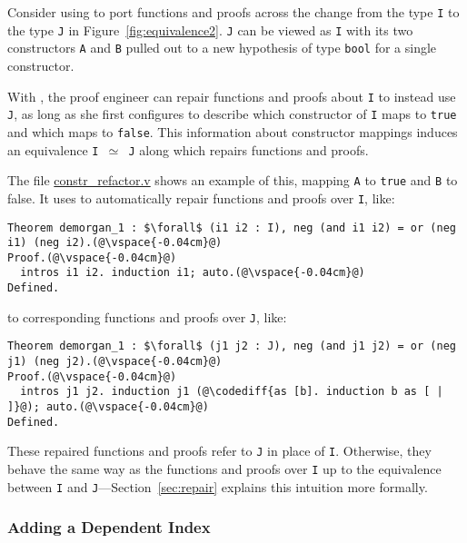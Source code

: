 Consider using \toolname to port functions and proofs across the change from the type \lstinline{I} to the type \lstinline{J} 
in Figure~\ref{fig:equivalence2}.
\lstinline{J} can be viewed as \lstinline{I} with its two constructors \lstinline{A} and \lstinline{B} pulled out to a
new hypothesis of type \lstinline{bool} for a single constructor.

With \toolname, the proof engineer can repair functions and proofs about \lstinline{I} to instead use \lstinline{J},
as long as she first configures \toolname to describe which constructor 
of \lstinline{I} maps to \lstinline{true} and which maps to \lstinline{false}.
This information about constructor mappings induces an equivalence \lstinline{I }$\simeq$\lstinline{ J}
along which \toolname repairs functions and proofs.

The file \href{https://github.com/uwplse/pumpkin-pi/blob/master/plugin/coq/playground/constr_refactor.v}{constr_refactor.v}
shows an example of this, mapping \lstinline{A} to \lstinline{true} and \lstinline{B} to false.
It uses \toolname to automatically repair functions and proofs over \lstinline{I}, like:

\begin{lstlisting}
Theorem demorgan_1 : $\forall$ (i1 i2 : I), neg (and i1 i2) = or (neg i1) (neg i2).(@\vspace{-0.04cm}@)
Proof.(@\vspace{-0.04cm}@)
  intros i1 i2. induction i1; auto.(@\vspace{-0.04cm}@)
Defined.
\end{lstlisting}
to corresponding functions and proofs over \lstinline{J}, like:

\begin{lstlisting}[backgroundcolor=\color{cyan!30}]
Theorem demorgan_1 : $\forall$ (j1 j2 : J), neg (and j1 j2) = or (neg j1) (neg j2).(@\vspace{-0.04cm}@)
Proof.(@\vspace{-0.04cm}@)
  intros j1 j2. induction j1 (@\codediff{as [b]. induction b as [ | ]}@); auto.(@\vspace{-0.04cm}@)
Defined.
\end{lstlisting}
These repaired functions and proofs refer to \lstinline{J} in place of \lstinline{I}.
Otherwise, they behave the same way as the functions and proofs over \lstinline{I} up to the equivalence between
\lstinline{I} and \lstinline{J}---Section~\ref{sec:repair} explains this intuition more formally.

\subsubsection{Adding a Dependent Index}
\label{sec:ex2}

